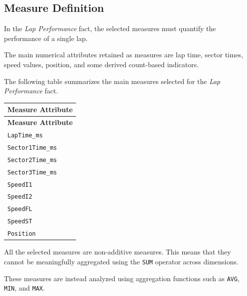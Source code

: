 \documentclass[a4paper,11pt]{article}
\begin{document}
	
	
	\subsection{Measure Definition}
	
	In the \textit{Lap Performance}
	fact, the selected measures must quantify the performance of a single lap.
	
	The main numerical attributes retained as measures are lap time, sector times, speed
	values, position, and some derived count-based indicators.
	
	The following table summarizes the main measures selected for the
	\textit{Lap Performance} fact.
	
	\begin{longtable}{|p{8cm}|}
	\hline
	\textbf{Measure Attribute} \\
	\hline
	\endfirsthead
	
	\hline
	\textbf{Measure Attribute} \\
	\hline
	\endhead
	
	\texttt{LapTime\_ms} \\
	\hline
	
	\texttt{Sector1Time\_ms} \\
	\hline
	
	\texttt{Sector2Time\_ms} \\
	\hline
	
	\texttt{Sector3Time\_ms} \\
	\hline
	
	\texttt{SpeedI1} \\
	\hline
	
	\texttt{SpeedI2} \\
	\hline
	
	\texttt{SpeedFL} \\
	\hline
	
	\texttt{SpeedST} \\
	\hline
	
	\texttt{Position} \\
	\hline
	
	\end{longtable}
	

	All the selected measures are non-additive measures. This means that they cannot be
	meaningfully aggregated using the \texttt{SUM} operator across dimensions.
	
	These measures are instead analyzed using aggregation functions such as
	\texttt{AVG}, \texttt{MIN}, and \texttt{MAX}.
	
\end{document}
